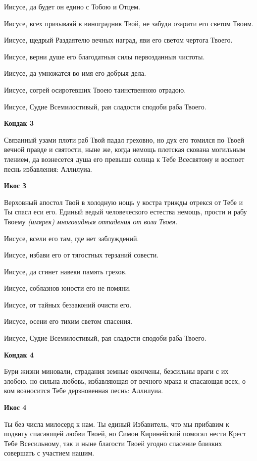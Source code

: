 Иисусе, да будет он едино с Тобою и Отцем. 


Иисусе, всех призываяй в виноградник Твой, не забуди озарити его светом Твоим. 


Иисусе, щедрый Раздаятелю вечных наград, яви его светом чертога Твоего. 


Иисусе, верни душе его благодатныя силы первозданныя чистоты. 


Иисусе, да умножатся во имя его добрыя дела. 


Иисусе, согрей осиротевших Твоею таинственною отрадою. 


Иисусе, Судие Всемилостивый, рая сладости сподоби раба Твоего.




\bfseries Кондак 3\normalfont{}


Связанный узами плоти раб Твой падал греховно, но дух его томился по Твоей вечной правде и святости, ныне же, когда немощь плотская скована могильным тлением, да вознесется душа его превыше солнца к Тебе Всесвятому и воспоет песнь избавления: Аллилуиа.




\bfseries Икос З\normalfont{}


Верховный апостол Твой в холодную нощь у костра трижды отрекся от Тебе и Ты спасл еси его. Единый ведый человеческого естества немощь, прости и рабу Твоему \itshape (имярек)\normalfont{} многовидныя отпадения от воли Твоея. 


Иисусе, всели его там, где нет заблуждений. 


Иисусе, избави его от тягостных терзаний совести. 


Иисусе, да сгинет навеки память грехов. 


Иисусе, соблазнов юности его не помяни. 


Иисусе, от тайных беззаконий очисти его. 


Иисусе, осени его тихим светом спасения. 


Иисусе, Судие Всемилостивый, рая сладости сподоби раба Твоего.




\bfseries Кондак 4\normalfont{}


Бури жизни миновали, страдания земные окончены, безсильны враги с их злобою, но сильна любовь, избавляющая от вечного мрака и спасающая всех, о ком возносится Тебе дерзновенная песнь: Аллилуиа.




\bfseries Икос 4\normalfont{}


Ты без числа милосерд к нам. Ты единый Избавитель, что мы прибавим к подвигу спасающей любви Твоей, но Симон Киринейский помогал нести Крест Тебе Всесильному, так и ныне благости Твоей угодно спасение близких совершать с участием нашим. 


